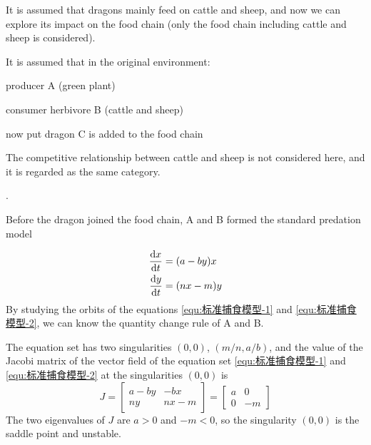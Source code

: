 It is assumed that dragons mainly feed on cattle and sheep, and now we can explore its impact on the food chain (only the food chain including cattle and sheep is considered).

It is assumed that in the original environment:

producer A (green plant) 

consumer herbivore B (cattle and sheep)

now put dragon C is added to the food chain

The competitive relationship between cattle and sheep is not considered here, and it is regarded as the same category.


 .\phantom{Thisisaphantomspacemade}
    
Before the dragon joined the food chain, A and B formed the standard predation model

 \begin{align}
    \frac{\mathrm{d}x}{\mathrm{d}t} &= (a-by)x \label{equ:标准捕食模型-1} \\
    \frac{\mathrm{d}y}{\mathrm{d}t} &= (nx-m)y \label{equ:标准捕食模型-2}
    \end{align}
By studying the orbits of the equations \eqref{equ:标准捕食模型-1} and \eqref{equ:标准捕食模型-2}, we can know the quantity change rule of A and B.

The equation set has two singularities $(0,0)$, $(m/n,a/b)$, and the value of the Jacobi matrix of the vector field of the equation set \eqref{equ:标准捕食模型-1} and \eqref{equ:标准捕食模型-2} at the singularities $(0,0)$ is
    \begin{equation}\label{equ:Jacobi矩阵-1}
    J = \begin{bmatrix} a-by & -bx \\ ny & nx-m \end{bmatrix}
      = \begin{bmatrix} a    & 0   \\ 0  & -m   \end{bmatrix}
    \end{equation}
The two eigenvalues of $J$ are $a>0$ and $-m<0$, so the singularity $(0,0)$ is the saddle point and unstable.

